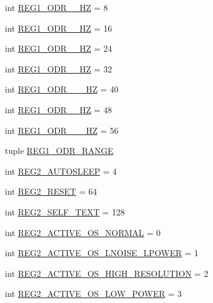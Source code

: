 \begin{DoxyCompactItemize}
\item 
int \hyperlink{classmma8451_1_1mma8451_a9246c231491e255487fdf52265603509}{R\+E\+G1\+\_\+\+O\+D\+R\+\_\+\_\+\+HZ} = 8
\item 
int \hyperlink{classmma8451_1_1mma8451_a7a8c792a6f997b3e8f0782e37fc653c1}{R\+E\+G1\+\_\+\+O\+D\+R\+\_\+\_\+\+HZ} = 16
\item 
int \hyperlink{classmma8451_1_1mma8451_aaaba8e0af3f800a17f99097584a7f2c2}{R\+E\+G1\+\_\+\+O\+D\+R\+\_\+\_\+\+HZ} = 24
\item 
int \hyperlink{classmma8451_1_1mma8451_a1035e107cbfb9f8ea0bd8d9791aa392c}{R\+E\+G1\+\_\+\+O\+D\+R\+\_\+\_\+\+HZ} = 32
\item 
int \hyperlink{classmma8451_1_1mma8451_a835a4efa1d33cde3e8091b8113b5dfd7}{R\+E\+G1\+\_\+\+O\+D\+R\+\_\+\_\+\_\+\+HZ} = 40
\item 
int \hyperlink{classmma8451_1_1mma8451_aa8417288dade1ee35f08210f2a86ce05}{R\+E\+G1\+\_\+\+O\+D\+R\+\_\+\_\+HZ} = 48
\item 
int \hyperlink{classmma8451_1_1mma8451_afa514ecabd97f94500f26256050f0d83}{R\+E\+G1\+\_\+\+O\+D\+R\+\_\+\_\+\_\+\+HZ} = 56
\item 
tuple \hyperlink{classmma8451_1_1mma8451_a189950c7292be13a56ef7822d0b37c3d}{R\+E\+G1\+\_\+\+O\+D\+R\+\_\+\+R\+A\+N\+GE}
\item 
int \hyperlink{classmma8451_1_1mma8451_a1ae300f552d1c1cef53720d5d5e32b22}{R\+E\+G2\+\_\+\+A\+U\+T\+O\+S\+L\+E\+EP} = 4
\item 
int \hyperlink{classmma8451_1_1mma8451_a472107dd3eb3308a4be8bdd5487c90d3}{R\+E\+G2\+\_\+\+R\+E\+S\+ET} = 64
\item 
int \hyperlink{classmma8451_1_1mma8451_ab4ba6823cb715bc63a83a109bb487900}{R\+E\+G2\+\_\+\+S\+E\+L\+F\+\_\+\+T\+E\+XT} = 128
\item 
int \hyperlink{classmma8451_1_1mma8451_a8860aa66ffd232be4ee16c7b6fc2075a}{R\+E\+G2\+\_\+\+A\+C\+T\+I\+V\+E\+\_\+\+O\+S\+\_\+\+N\+O\+R\+M\+AL} = 0
\item 
int \hyperlink{classmma8451_1_1mma8451_ae414025000132230109ebb73e7aec3b6}{R\+E\+G2\+\_\+\+A\+C\+T\+I\+V\+E\+\_\+\+O\+S\+\_\+\+L\+N\+O\+I\+S\+E\+\_\+\+L\+P\+O\+W\+ER} = 1
\item 
int \hyperlink{classmma8451_1_1mma8451_aefe76f264ec1028d2dd2ad1ccf99c800}{R\+E\+G2\+\_\+\+A\+C\+T\+I\+V\+E\+\_\+\+O\+S\+\_\+\+H\+I\+G\+H\+\_\+\+R\+E\+S\+O\+L\+U\+T\+I\+ON} = 2
\item 
int \hyperlink{classmma8451_1_1mma8451_aaf98f3185a208a6230116c75bbc744c4}{R\+E\+G2\+\_\+\+A\+C\+T\+I\+V\+E\+\_\+\+O\+S\+\_\+\+L\+O\+W\+\_\+\+P\+O\+W\+ER} = 3

\end{DoxyCompactItemize}
